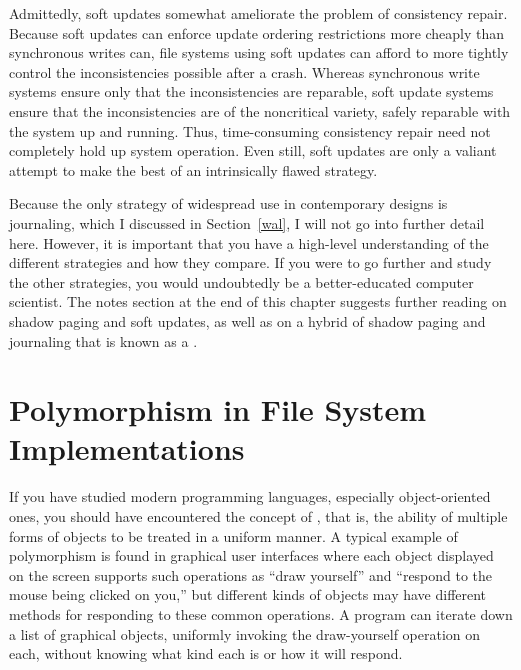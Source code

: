 Admittedly, soft updates somewhat ameliorate the problem of
consistency repair.  Because soft updates can enforce update ordering
restrictions more cheaply than synchronous writes can, file systems
using soft updates can afford to more tightly control the
inconsistencies possible after a crash.  Whereas synchronous write
systems ensure only that the inconsistencies are reparable, soft
update systems ensure that the inconsistencies are of the noncritical
variety, safely reparable
with the system up and running.  Thus, time-consuming consistency
repair need not completely hold up system operation.  Even still, soft
updates are only a valiant attempt to make the best of an
intrinsically flawed strategy.

Because the only strategy of widespread use in contemporary designs is
journaling, which I discussed in Section~\ref{wal}, I will not go
into further detail here.  However, it is important that you have a
high-level understanding of the different strategies and how they
compare.  If you were to go further and study the other strategies,
you would undoubtedly be a better-educated computer scientist.  The notes section at the end
of this chapter suggests further reading on shadow paging and soft
updates, as well as on a hybrid of shadow paging and journaling that is known
as a .

\section{Polymorphism in File System Implementations}\label{vfs-section}

If you have studied modern programming languages, especially
object-oriented ones, you should have encountered the concept of
, that is, the ability of multiple forms of
objects to be treated in a uniform manner.  A typical example of polymorphism is found in
graphical user interfaces where each object displayed on the screen
supports such operations as ``draw yourself'' and ``respond to the
mouse being clicked on you,'' but different kinds of objects may have
different methods for responding to these common operations.  A
program can iterate down a list of graphical objects, uniformly
invoking the draw-yourself operation on each, without knowing what
kind each is or how it will respond.

